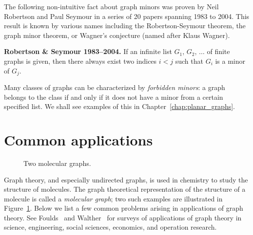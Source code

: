 The following non-intuitive fact about graph minors was proven by
Neil Robertson and Paul
Seymour in a series of 20 papers spanning 1983
to 2004. This result is known by various names including the
Robertson-Seymour theorem, the graph minor theorem, or Wagner's
conjecture (named after Klaus
Wagner).

\begin{theorem}
\label{thm:introduction:graph_minor}
\textbf{Robertson \& Seymour 1983--2004.}
If an infinite list $G_1$, $G_2$, $\dots$ of finite graphs is given,
then there always exist two indices $i < j$ such that $G_i$ is a minor
of $G_j$.
\end{theorem}

Many classes of graphs can be characterized by
\emph{forbidden minors}: a graph belongs to the
class if and only if it does not have a minor from a certain specified
list. We shall see examples of this in Chapter~\ref{chap:planar_graphs}.



\section{Common applications}
\label{sec:introduction:common_applications}

\begin{figure}[!htbp]
\centering
{}

\caption{Two molecular graphs.}
\label{fig:introduction:molecular_graphs}
\end{figure}

\noindent
Graph theory, and especially undirected graphs, is used in chemistry
to study the structure of molecules. The graph theoretical
representation of the structure of a molecule is called a
\emph{molecular graph}; two such examples are
illustrated in Figure~\ref{fig:introduction:molecular_graphs}. Below
we list a few common problems arising in applications of graph
theory. See Foulds~\cite{Foulds1992} and
Walther~\cite{Walther1984} for surveys of
applications of graph theory in science, engineering, social sciences,
economics, and operation research.

